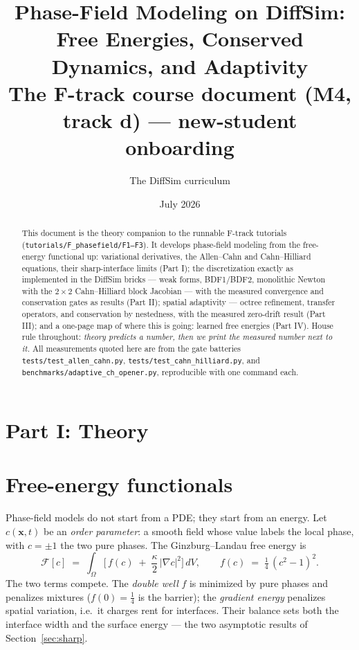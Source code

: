 \documentclass[11pt]{article}
\title{Phase-Field Modeling on DiffSim:\\
  Free Energies, Conserved Dynamics, and Adaptivity\\
  \large The F-track course document (M4, track d) --- new-student onboarding}
\author{The DiffSim curriculum}
\date{July 2026}
\begin{document}
\maketitle

\begin{abstract}
This document is the theory companion to the runnable F-track tutorials
(\texttt{tutorials/F\_phasefield/F1--F3}). It develops phase-field
modeling from the free-energy functional up: variational derivatives,
the Allen--Cahn and Cahn--Hilliard equations, their sharp-interface
limits (Part I); the discretization exactly as implemented in the
DiffSim bricks --- weak forms, BDF1/BDF2, monolithic Newton with the
$2\times 2$ Cahn--Hilliard block Jacobian --- with the measured
convergence and conservation gates as results (Part II); spatial
adaptivity --- octree refinement, transfer operators, and conservation
by nestedness, with the measured zero-drift result (Part III); and a
one-page map of where this is going: learned free energies (Part IV).
House rule throughout: \emph{theory predicts a number, then we print
the measured number next to it.} All measurements quoted here are from
the gate batteries \texttt{tests/test\_allen\_cahn.py},
\texttt{tests/test\_cahn\_hilliard.py}, and
\texttt{benchmarks/adaptive\_ch\_opener.py}, reproducible with one
command each.
\end{abstract}

\tableofcontents

\section*{Part I: Theory}

\section{Free-energy functionals}

Phase-field models do not start from a PDE; they start from an energy.
Let $c(\mathbf{x},t)$ be an \emph{order parameter}: a smooth field
whose value labels the local phase, with $c=\pm 1$ the two pure phases.
The Ginzburg--Landau free energy is
\begin{equation}
  \mathcal{F}[c] \;=\; \int_\Omega \Big[\, f(c)
    \;+\; \frac{\kappa}{2}\,\lvert\nabla c\rvert^2 \Big]\, dV,
  \qquad
  f(c) \;=\; \tfrac14\,(c^2-1)^2 .
  \label{eq:F}
\end{equation}
The two terms compete. The \emph{double well} $f$ is minimized by pure
phases and penalizes mixtures ($f(0)=\tfrac14$ is the barrier); the
\emph{gradient energy} penalizes spatial variation, i.e.\ it charges
rent for interfaces. Their balance sets both the interface width and
the surface energy --- the two asymptotic results of
Section~\ref{sec:sharp}.
\end{document}
